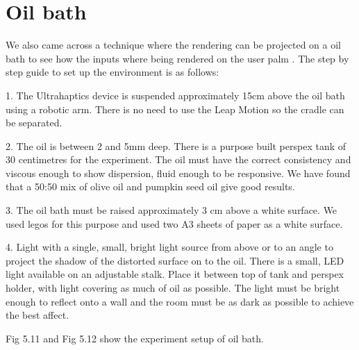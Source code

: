 \section{Oil bath}
\label{sec:validation:oilbath}

We also came across a technique where the rendering can be projected on a oil bath to see how the inputs where being rendered on the user palm \cite{oil}. The step by step guide to set up the environment is as follows:

1. The Ultrahaptics device is suspended approximately 15cm above the oil bath using a robotic arm. There is no need to use the Leap Motion so the cradle can be separated. 

2. The oil is between 2 and 5mm deep. There is a purpose built perspex tank of 30 centimetres for the experiment. The oil must have the correct consistency and viscous enough to show dispersion, fluid enough to be responsive. We have found that a 50:50 mix of olive oil and pumpkin seed oil give good results. 

3. The oil bath must be raised approximately 3 cm above a white surface. We used legos for this purpose and used two A3 sheets of paper as a white surface.

4. Light with a single, small, bright light source from above or to an angle to project the shadow of the distorted surface on to the oil. There is a small, LED light available on an adjustable stalk. Place it between top of tank and perspex holder, with light covering as much of oil as possible. The light must be bright enough to reflect onto a wall and the room must be as dark as possible to achieve the best affect.

Fig 5.11 and Fig 5.12 show the experiment setup of oil bath. 

